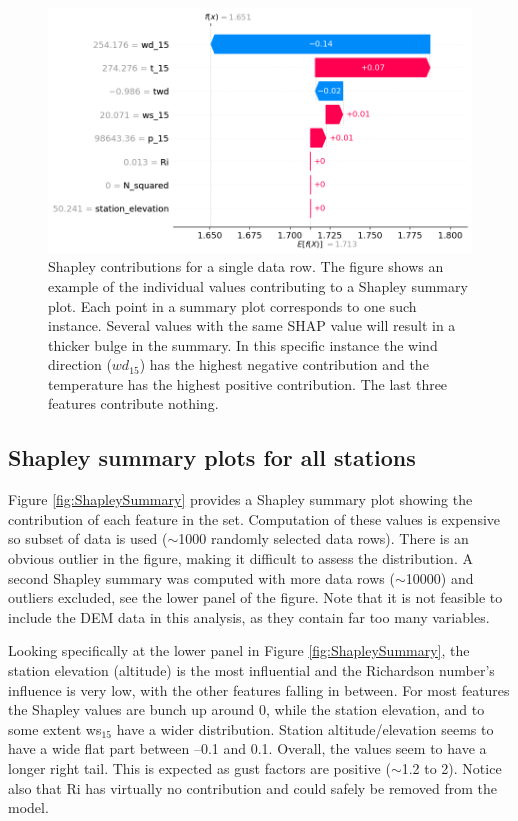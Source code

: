 \begin{figure}[h]
  \centering
  \includegraphics[scale = 0.6]{Figures/shap_plots/waterfall_plot.png}
  \caption[Shapley contributions for a single observation]{Shapley contributions for a single data row. The figure shows an example of the individual values contributing to a Shapley summary plot. Each point in a summary plot corresponds to one such instance. Several values with the same SHAP value will result in a thicker bulge in the summary. In this specific instance the wind direction ($wd_{15}$) has the highest negative contribution and the temperature has the highest positive contribution. The last three features contribute nothing.}
  \label{fig:ShapleyWaterfall}
\end{figure}

\subsection{Shapley summary plots for all stations}

Figure \ref{fig:ShapleySummary} provides a Shapley summary plot showing the contribution of each feature in the set. Computation of these values is expensive so subset of data is used ($\sim$1000 randomly selected data rows). There is an obvious outlier in the figure, making it difficult to assess the distribution. A second Shapley summary was computed with more data rows ($\sim$10000) and outliers excluded, see the lower panel of the figure. Note that it is not feasible to include the DEM data in this analysis, as they contain far too many variables.

Looking specifically at the lower panel in Figure \ref{fig:ShapleySummary}, the station elevation (altitude) is the most influential and the Richardson number's influence is very low, with the other features falling in between. For most features the Shapley values are bunch up around 0, while the station elevation, and to some extent ws$_{15}$ have a wider distribution. Station altitude/elevation seems to have a wide flat part between –0.1 and 0.1. Overall, the values seem to have a longer right tail. This is expected as gust factors are positive ($\sim$1.2 to 2). Notice also that Ri has virtually no contribution and could safely be removed from the model.

